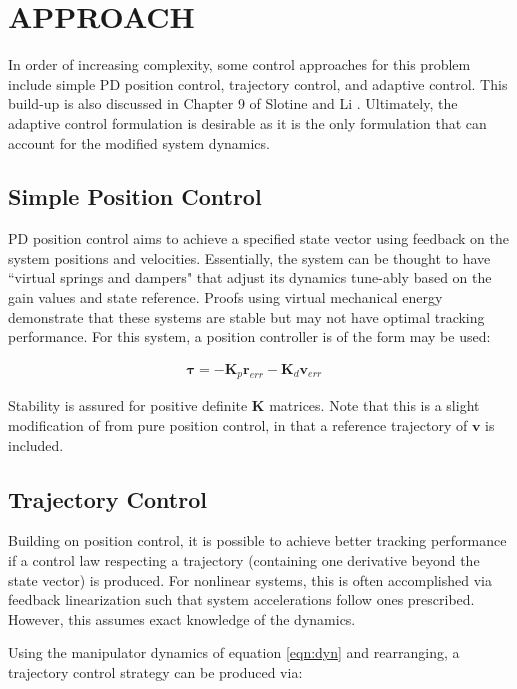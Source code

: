 \documentclass[letterpaper, 10 pt, conference]{ieeeconf}  %
\begin{document}
\section{APPROACH}
 
In order of increasing complexity, some control approaches for this problem include simple PD position control, trajectory control, and adaptive control. This build-up is also discussed in Chapter 9 of Slotine and Li \cite{Slotine}. Ultimately, the adaptive control formulation is desirable as it is the only formulation that can account for the modified system dynamics.
 
\subsection{Simple Position Control}

PD position control aims to achieve a specified state vector using feedback on the system positions and velocities. Essentially, the system can be thought to have ``virtual springs and dampers" that adjust its dynamics tune-ably based on the gain values and state reference. Proofs using virtual mechanical energy demonstrate that these systems are stable but may not have optimal tracking performance. For this system, a position controller is of the form may be used:

\begin{align}
	\bm{\tau} = -\mathbf{K}_p \mathbf{r}_{err} -\mathbf{K}_d \mathbf{v}_{err} &
\end{align}

Stability is assured for positive definite $\mathbf{K}$ matrices. Note that this is a slight modification of from pure position control, in that a reference trajectory of $\mathbf{v}$ is included.

\subsection{Trajectory Control}

Building on position control, it is possible to achieve better tracking performance if a control law respecting a trajectory (containing one derivative beyond the state vector) is produced. For nonlinear systems, this is often accomplished via feedback linearization such that system accelerations follow ones prescribed. However, this assumes exact knowledge of the dynamics.

Using the manipulator dynamics of equation \ref{eqn:dyn} and rearranging, a trajectory control strategy can be produced via:
\end{document}
